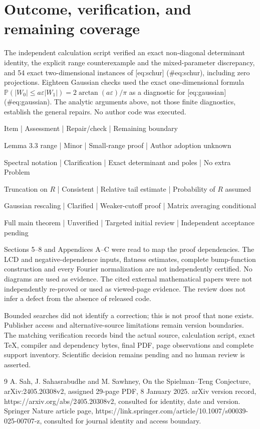 \documentclass[10pt]{article}
\begin{document}
\section*{Outcome, verification, and remaining coverage}
The independent calculation script verified an exact non-diagonal determinant identity, the explicit range counterexample and the mixed-parameter discrepancy, and 54 exact two-dimensional instances of [eq:schur] (\#eq:schur), including zero projections. Eighteen Gaussian checks used the exact one-dimensional formula \(\mathbb P(|W_0|\leq a\varepsilon|W_1|)=2\arctan(a\varepsilon)/\pi\) as a diagnostic for [eq:gaussian] (\#eq:gaussian). The analytic arguments above, not those finite diagnostics, establish the general repairs. No author code was executed.\par
Item | Assessment | Repair/check | Remaining boundary\par
Lemma 3.3 range | Minor | Small-range proof | Author adoption unknown\par
Spectral notation | Clarification | Exact determinant and poles | No extra Problem\par
Truncation on \(R\) | Consistent | Relative tail estimate | Probability of \(R\) assumed\par
Gaussian rescaling | Clarified | Weaker-cutoff proof | Matrix averaging conditional\par
Full main theorem | Unverified | Targeted initial review | Independent acceptance pending\par
Sections 5–8 and Appendices A–C were read to map the proof dependencies. The LCD and negative-dependence inputs, flatness estimates, complete bump-function construction and every Fourier normalization are not independently certified. No diagrams are used as evidence. The cited external mathematical papers were not independently re-proved or used as viewed-page evidence. The review does not infer a defect from the absence of released code.\par
Bounded searches did not identify a correction; this is not proof that none exists. Publisher access and alternative-source limitations remain version boundaries. The matching verification records bind the actual source, calculation script, exact TeX, compiler and dependency bytes, final PDF, page observations and complete support inventory. Scientific decision remains pending and no human review is asserted.\par
9 A. Sah, J. Sahasrabudhe and M. Sawhney, On the Spielman–Teng Conjecture, arXiv:2405.20308v2, assigned 29-page PDF, 8 January 2025. arXiv version record, https://arxiv.org/abs/2405.20308v2, consulted for identity, date and version. Springer Nature article page, https://link.springer.com/article/10.1007/s00039-025-00707-z, consulted for journal identity and access boundary.\par
\end{document}
